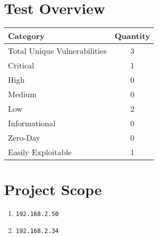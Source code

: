 \documentclass[a4paper,12pt]{article}
\begin{document}
\section{Test Overview}
\begin{table}[ht]
    \centering
    \begin{tabular}{lc}
        \toprule
        \rowcolor{gray!20} \textbf{Category} & \textbf{Quantity} \\
        \midrule
        Total Unique Vulnerabilities & 3 \\
        Critical & 1 \\
        High & 0 \\
        Medium & 0 \\
        Low & 2 \\
        Informational & 0 \\ \hline
        Zero-Day & 0 \\
        Easily Exploitable & 1 \\
        \bottomrule
    \end{tabular}
\end{table}

\section{Project Scope}
\begin{enumerate}
    \item \texttt{192.168.2.50}
    \item \texttt{192.168.2.34}
\end{enumerate}
\end{document}
